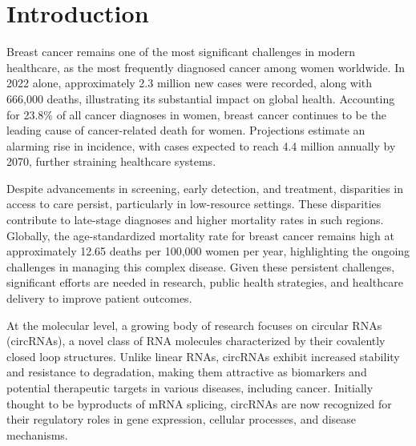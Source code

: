 \chapter{Introduction}

Breast cancer remains one of the most significant challenges in modern
healthcare, as the most frequently diagnosed cancer among women worldwide.
In 2022 alone, approximately 2.3 million new cases were recorded, along with
666,000 deaths, illustrating its substantial impact on global health.
Accounting for 23.8\% of all cancer diagnoses in
women\supercite{bray_global_2024,ferlay_global_2024}, breast cancer continues
to be the leading cause of cancer-related death for women.
Projections estimate an alarming rise in incidence, with cases expected to
reach 4.4 million annually by 2070, further straining healthcare
systems\supercite{lei_global_2021}.

Despite advancements in screening, early detection, and treatment, disparities
in access to care persist, particularly in low-resource settings.
These disparities contribute to late-stage diagnoses and higher mortality rates
in such regions\supercite{wilkinson_understanding_2022,ginsburg_breast_2020}.
Globally, the age-standardized mortality rate for breast cancer remains high at
approximately 12.65 deaths per 100,000 women per year, highlighting the ongoing
challenges in managing this complex
disease\supercite{bray_global_2024,ferlay_global_2024}.
Given these persistent challenges, significant efforts are needed in research,
public health strategies, and healthcare delivery to improve patient
outcomes\supercite{desantis_breast_2019}.

At the molecular level, a growing body of research focuses on circular RNAs
(circRNAs), a novel class of RNA molecules characterized by their covalently
closed loop structures.
Unlike linear RNAs, circRNAs exhibit increased stability and resistance to
degradation, making them attractive as biomarkers and potential therapeutic
targets in various diseases, including
cancer\supercite{ma_circular_2020,hoque_exploring_2023,wilusz_circular_2017}.
Initially thought to be byproducts of mRNA splicing, circRNAs are now
recognized for their regulatory roles in gene expression, cellular processes,
and disease mechanisms\supercite{cherubini_foxp1_2019,wilusz_360_2018}.

